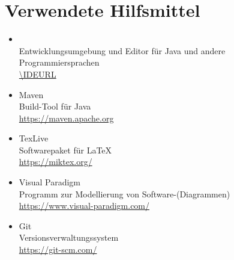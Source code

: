 \chapter{Verwendete Hilfsmittel}\label{ch:verwendete-hilfsmittel}

\begin{itemize}
    \item \IDE \ \IDEVersion \\ Entwicklungsumgebung und Editor für Java und andere Programmiersprachen \\\url{\IDEURL}
    \item Maven\\Build-Tool für Java\\\url{https://maven.apache.org}
    \item TexLive \TexLiveVersion\\Softwarepaket für \LaTeX\\\url{https://miktex.org/}
    \item Visual Paradigm\\Programm zur Modellierung von Software-(Diagrammen) \\\url{https://www.visual-paradigm.com/}
    \item Git\\Versionsverwaltungssystem \\\url{https://git-scm.com/}
\end{itemize}